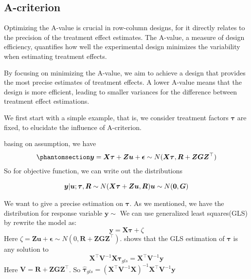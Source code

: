 \documentclass[
  a4paper,
  oneside,
  openany,
  12pt,
  onecolumn]{book}
\theoremstyle{definition}
\theoremstyle{plain}
\theoremstyle{remark}
\begin{document}
\subsection{A-criterion}\label{a-criterion}

Optimizing the A-value is crucial in row-column designs, for it directly
relates to the precision of the treatment effect estimates. The A-value,
a measure of design efficiency, quantifies how well the experimental
design minimizes the variability when estimating treatment effects.

By focusing on minimizing the A-value, we aim to achieve a design that
provides the most precise estimates of treatment effects. A lower
A-value means that the design is more efficient, leading to smaller
variances for the difference between treatment effect estimations.

We first start with a simple example, that is, we consider treatment
factors \(\boldsymbol{\tau}\) are fixed, to elucidate the influence of
A-criterion.

basing on assumption, we have
\begin{equation}\phantomsection\label{eq-asp}{
\boldsymbol{y}=\boldsymbol{X}\boldsymbol{\tau}+\boldsymbol{Z}\boldsymbol{u}+\boldsymbol{\epsilon}\sim N(\boldsymbol{X}\boldsymbol{\tau},\boldsymbol{R}+\boldsymbol{ZGZ}^\top)
}\end{equation} So for objective function, we can write out the
distributions

\[
\boldsymbol{y}|\boldsymbol{u};\boldsymbol{\tau},\boldsymbol{R}\sim N(\boldsymbol{X}\boldsymbol{\tau}+\boldsymbol{Z}\boldsymbol{u},\boldsymbol{R}) \\
\boldsymbol{u}\sim N(\boldsymbol{0},\boldsymbol{G})
\]

We want to give a precise estimation on \(\boldsymbol{\tau}\). As we
mentioned, we have the distribution for response variable
\(\boldsymbol{y}\sim\) We can use generalized least squares(GLS) by
rewrite the model as: \[
\boldsymbol{y} = \boldsymbol{X}\boldsymbol{\tau} + \zeta
\] Here
\(\zeta = \boldsymbol{Z}\boldsymbol{u}+\boldsymbol{\epsilon}\sim N(0, \boldsymbol{R}+\boldsymbol{Z}\boldsymbol{G}\boldsymbol{Z}^\top)\).
\citet{henderson1975best} shows that the GLS estimation of
\(\boldsymbol{\tau}\) is any solution to \[
\boldsymbol{X}^\top\boldsymbol{V}^{-1}\boldsymbol{X}\hat{\boldsymbol{\tau}}_{gls}=\boldsymbol{X}^\top\boldsymbol{V}^{-1}\boldsymbol{y}
\] Here
\(\boldsymbol{V}=\boldsymbol{R}+\boldsymbol{Z}\boldsymbol{G}\boldsymbol{Z}^\top\).
So
\(\hat{\boldsymbol{\tau}}_{gls} = (\boldsymbol{X}^\top\boldsymbol{V}^{-1}\boldsymbol{X})^{-1}\boldsymbol{X}^\top\boldsymbol{V}^{-1}\boldsymbol{y}\)
\end{document}
